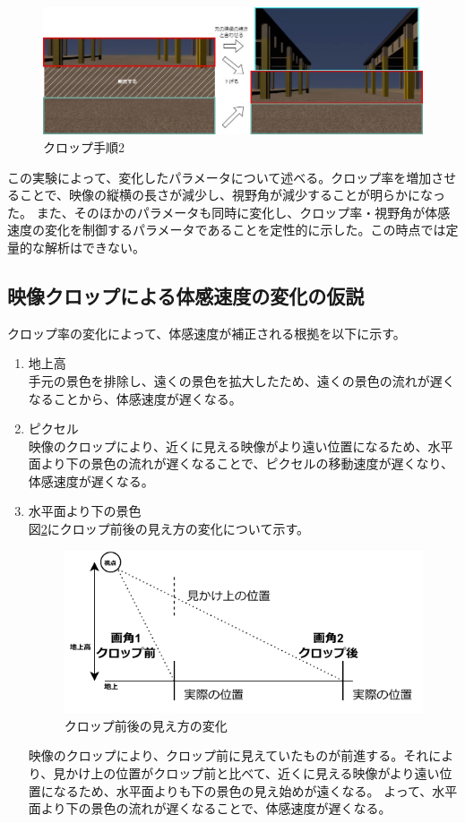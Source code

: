 \begin{figure}[h]
  \begin{center}
  \includegraphics[width=.9\linewidth]{img/8_2.jpg}
  \caption{クロップ手順2}
  \label{taikan:crop2}
  \end{center}
\end{figure}
\clearpage
この実験によって、変化したパラメータについて述べる。クロップ率を増加させることで、映像の縦横の長さが減少し、視野角が減少することが明らかになった。
また、そのほかのパラメータも同時に変化し、クロップ率・視野角が体感速度の変化を制御するパラメータであることを定性的に示した。この時点では定量的な解析はできない。

\subsection{映像クロップによる体感速度の変化の仮説}
クロップ率の変化によって、体感速度が補正される根拠を以下に示す。
\begin{enumerate}
  \item 地上高\\
  手元の景色を排除し、遠くの景色を拡大したため、遠くの景色の流れが遅くなることから、体感速度が遅くなる。
  \item ピクセル\\
  映像のクロップにより、近くに見える映像がより遠い位置になるため、水平面より下の景色の流れが遅くなることで、ピクセルの移動速度が遅くなり、体感速度が遅くなる。
  \item 水平面より下の景色\\
  図\ref{taikan:cropzengo}にクロップ前後の見え方の変化について示す。

  \begin{figure}[h]
    \begin{center}
    \includegraphics[width=.8\linewidth]{img/9_1.pdf}
    \caption{クロップ前後の見え方の変化}
    \label{taikan:cropzengo}
    \end{center}
  \end{figure}
  映像のクロップにより、クロップ前に見えていたものが前進する。それにより、見かけ上の位置がクロップ前と比べて、近くに見える映像がより遠い位置になるため、水平面よりも下の景色の見え始めが遠くなる。
よって、水平面より下の景色の流れが遅くなることで、体感速度が遅くなる。
\end{enumerate}

